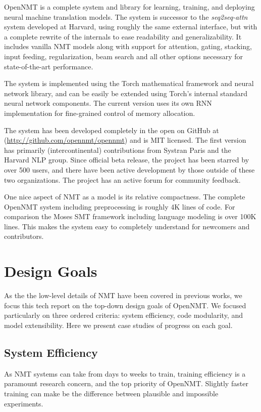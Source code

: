\documentclass[11pt]{article}
\begin{document}
OpenNMT is a complete system and library for learning, training, and
deploying neural machine translation models. The system is successor
to the \textit{seq2seq-attn} system developed at Harvard, using
roughly the same external interface, but with a complete rewrite of
the internals to ease readability and generalizability. It includes
vanilla NMT models along with support for attention, gating, stacking,
input feeding, regularization, beam search and all other options necessary
for state-of-the-art performance.  

The system is implemented using the Torch mathematical framework and
neural network library, and can be easily be extended using Torch's
internal standard neural network components. The current version uses
its own RNN implementation for fine-grained control of memory
allocation. 

The system has been developed completely in the open on GitHub at
(\url{http://github.com/opennmt/opennmt}) and is MIT licensed.  The
first version has primarily (intercontinental) contributions from
Systran Paris and the Harvard NLP group. Since official beta release,
the project has been starred by over 500 users, and there have been
active development by those outside of these two organizations. The
project has an active forum for community feedback.


One nice aspect of NMT as a model is its relative compactness. The
complete OpenNMT system including preprocessing is roughly 4K lines of
code. For comparison the Moses SMT framework including language
modeling is over 100K lines. This makes the system easy to completely
understand for newcomers and contributors.



\section{Design Goals}


As the the low-level details of NMT have been covered in previous
works, we focus this tech report on the top-down design goals of
OpenNMT. We focused particularly on three ordered criteria:
system efficiency, code modularity, and model extensibility. 
Here we present case studies of progress on each goal.

\subsection{System Efficiency}

As NMT systems can take from days to weeks to train, training
efficiency is a paramount research concern, and the top priority of
OpenNMT. Slightly faster training can make be the difference between
plausible and impossible experiments.
\end{document}

